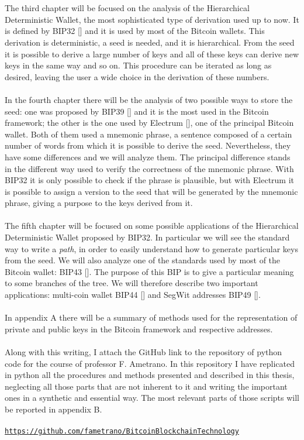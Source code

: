 \\ \\
The third chapter will be focused on the analysis of the Hierarchical Deterministic Wallet, the most sophisticated type of derivation used up to now. It is defined by BIP32 [\cite{1}] and it is used by most of the Bitcoin wallets. This derivation is deterministic, a seed is needed, and it is hierarchical. From the seed it is possible to derive a large number of keys and all of these keys can derive new keys in the same way and so on. This procedure can be iterated as long as desired, leaving the user a wide choice in the derivation of these numbers.
\\ \\
In the fourth chapter there will be the analysis of two possible ways to store the seed: one was proposed by BIP39 [\cite{2}] and it is the most used in the Bitcoin framework; the other is the one used by Electrum [\cite{3}], one of the principal Bitcoin wallet. Both of them used a mnemonic phrase, a sentence composed of a certain number of words from which it is possible to derive the seed. Nevertheless, they have some differences and we will analyze them. The principal difference stands in the different way used to verify the correctness of the mnemonic phrase. With BIP32 it is only possible to check if the phrase is plausible, but with Electrum it is possible to assign a version to the seed that will be generated by the mnemonic phrase, giving a purpose to the keys derived from it.
\\ \\
The fifth chapter will be focused on some possible applications of the Hierarchical Deterministic Wallet proposed by BIP32. In particular we will see the standard way to write a \textit{path}, in order to easily understand how to generate particular keys from the seed.  We will also analyze one of the standards used by most of the Bitcoin wallet: BIP43 [\cite{4}]. The purpose of this BIP is to give a particular meaning to some branches of the tree. We will therefore describe two important applications: multi-coin wallet BIP44 [\cite{5}] and SegWit addresses BIP49 [\cite{6}].
\\ \\
In appendix A there will be a summary of methods used for the representation of private and public keys in the Bitcoin framework and respective addresses.
\\ \\
Along with this writing, I attach the GitHub link to the repository of python code for the course of professor F. Ametrano. In this repository I have replicated in python all the procedures and methods presented and described in this thesis, neglecting all those parts that are not inherent to it and writing the important ones in a synthetic and essential way. The most relevant parts of those scripts will be reported in appendix B.
\\ \\
\hypersetup{
	colorlinks=true,
	urlcolor=black
}
\href{https://github.com/fametrano/BitcoinBlockchainTechnology}{\texttt{https://github.com/fametrano/BitcoinBlockchainTechnology}}
